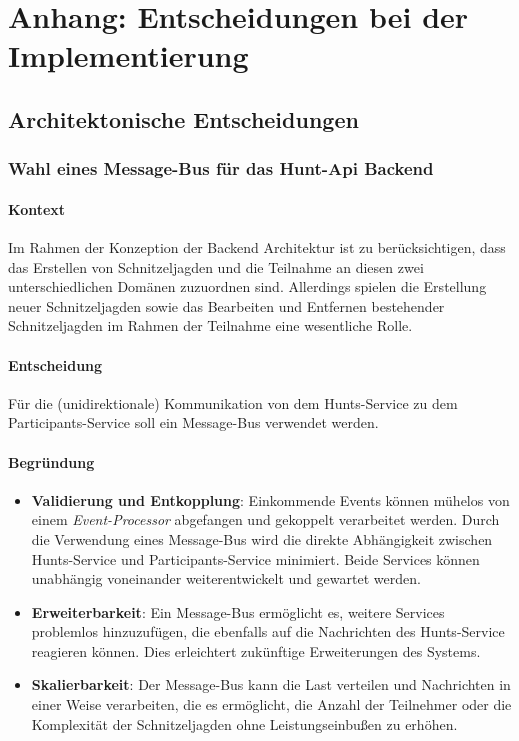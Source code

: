 \chapter{Anhang: Entscheidungen bei der Implementierung}

\section{Architektonische Entscheidungen}

\subsection{Wahl eines Message-Bus für das Hunt-Api Backend} \label{appendix:adr:messagebus}

\subsubsection{Kontext}

Im Rahmen der Konzeption der Backend Architektur ist zu berücksichtigen, dass das Erstellen von Schnitzeljagden und die Teilnahme an diesen zwei unterschiedlichen Domänen zuzuordnen sind. Allerdings spielen die Erstellung neuer Schnitzeljagden sowie das Bearbeiten und Entfernen bestehender Schnitzeljagden im Rahmen der Teilnahme eine wesentliche Rolle.

\subsubsection{Entscheidung}

Für die (unidirektionale) Kommunikation von dem Hunts-Service zu dem Participants-Service soll ein Message-Bus verwendet werden.

\subsubsection{Begründung}

\begin{itemize}
    \item \textbf{Validierung und Entkopplung}: Einkommende Events können mühelos von einem \textit{Event-Processor} abgefangen und gekoppelt verarbeitet werden. Durch die Verwendung eines Message-Bus wird die direkte Abhängigkeit zwischen Hunts-Service und Participants-Service minimiert. Beide Services können unabhängig voneinander weiterentwickelt und gewartet werden.
    \item \textbf{Erweiterbarkeit}: Ein Message-Bus ermöglicht es, weitere Services problemlos hinzuzufügen, die ebenfalls auf die Nachrichten des Hunts-Service reagieren können. Dies erleichtert zukünftige Erweiterungen des Systems.
    \item \textbf{Skalierbarkeit}: Der Message-Bus kann die Last verteilen und Nachrichten in einer Weise verarbeiten, die es ermöglicht, die Anzahl der Teilnehmer oder die Komplexität der Schnitzeljagden ohne Leistungseinbußen zu erhöhen.
\end{itemize}

